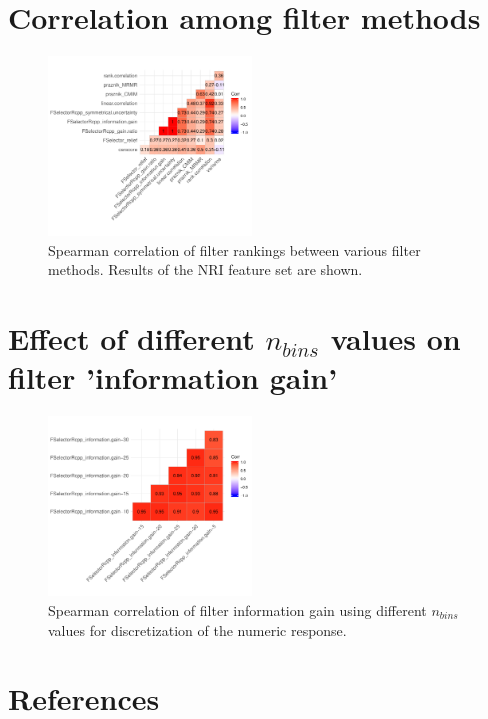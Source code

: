 \documentclass[letterpaper, peerreview]{IEEEtran}
\begin{document}
\pagebreak

\section{Correlation among filter methods}

\begin{figure} [ht]
	\begin{center}
		\includegraphics[width=0.48\textwidth] {correlation-filter-nri-1.pdf}
		\caption{Spearman correlation of filter rankings between various filter methods. Results of the NRI feature set are shown.}\label{fig:correlation-filters}
	\end{center}
\end{figure}

\section{Effect of different \texorpdfstring{\(n_{bins}\)}{nbins} values on filter 'information gain'}

\begin{figure} [ht]
	\begin{center}
		\includegraphics[width=0.48\textwidth] {correlation-nbins-1.pdf}
		\caption{Spearman correlation of filter information gain using different \texttt{\(n_{bins}\)} values for discretization of the numeric response.}\label{fig:correlation-nbins}
	\end{center}
\end{figure}






\section*{References}
\end{document}
